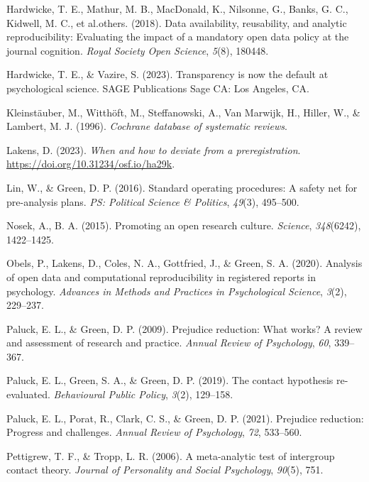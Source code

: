 \documentclass[
  man]{apa6}
\newlength{\cslhangindent}
\newenvironment{CSLReferences}[2] %
 {\begin{list}{}{%
  \setlength{\itemindent}{0pt}
  \setlength{\leftmargin}{0pt}
  \setlength{\parsep}{0pt}
  \ifodd #1
   \setlength{\leftmargin}{\cslhangindent}
   \setlength{\itemindent}{-1\cslhangindent}
  \fi
  \setlength{\itemsep}{#2\baselineskip}}}
 {\end{list}}
\begin{document}
\begin{CSLReferences}{1}{0}
Hardwicke, T. E., Mathur, M. B., MacDonald, K., Nilsonne, G., Banks, G. C., Kidwell, M. C., et al.others. (2018). Data availability, reusability, and analytic reproducibility: Evaluating the impact of a mandatory open data policy at the journal cognition. \emph{Royal Society Open Science}, \emph{5}(8), 180448.

Hardwicke, T. E., \& Vazire, S. (2023). Transparency is now the default at psychological science. SAGE Publications Sage CA: Los Angeles, CA.

Kleinstäuber, M., Witthöft, M., Steffanowski, A., Van Marwijk, H., Hiller, W., \& Lambert, M. J. (1996). \emph{Cochrane database of systematic reviews}.

Lakens, D. (2023). \emph{When and how to deviate from a preregistration}. \url{https://doi.org/10.31234/osf.io/ha29k}.

Lin, W., \& Green, D. P. (2016). Standard operating procedures: A safety net for pre-analysis plans. \emph{PS: Political Science \& Politics}, \emph{49}(3), 495--500.

Nosek, A., B. A. (2015). Promoting an open research culture. \emph{Science}, \emph{348}(6242), 1422--1425.

Obels, P., Lakens, D., Coles, N. A., Gottfried, J., \& Green, S. A. (2020). Analysis of open data and computational reproducibility in registered reports in psychology. \emph{Advances in Methods and Practices in Psychological Science}, \emph{3}(2), 229--237.

Paluck, E. L., \& Green, D. P. (2009). Prejudice reduction: What works? A review and assessment of research and practice. \emph{Annual Review of Psychology}, \emph{60}, 339--367.

Paluck, E. L., Green, S. A., \& Green, D. P. (2019). The contact hypothesis re-evaluated. \emph{Behavioural Public Policy}, \emph{3}(2), 129--158.

Paluck, E. L., Porat, R., Clark, C. S., \& Green, D. P. (2021). Prejudice reduction: Progress and challenges. \emph{Annual Review of Psychology}, \emph{72}, 533--560.

Pettigrew, T. F., \& Tropp, L. R. (2006). A meta-analytic test of intergroup contact theory. \emph{Journal of Personality and Social Psychology}, \emph{90}(5), 751.


\end{CSLReferences}
\end{document}
